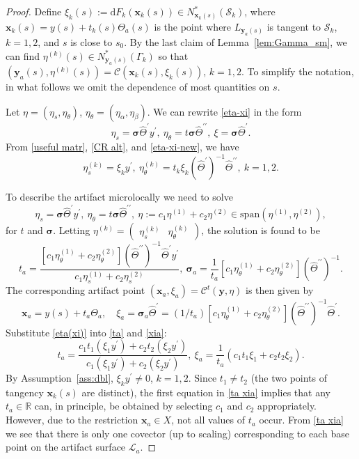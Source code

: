 \documentclass[11pt]{article}
\newcommand{\be}{\begin{equation}}
\newcommand{\ee}{\end{equation}}
\newcommand{\s}{\mathcal S}
\newcommand{\cC}{\mathcal C}
\newcommand{\CL}{\mathcal L}
\newcommand{\br}{\mathbb{R}}
\newcommand{\bt}{\beta}
\newcommand{\al}{\alpha}
\newcommand{\dd}{\mathrm{d}}
\numberwithin{equation}{section}
\newcommand{\vy}{\mathbf{y}}
\newcommand{\vx}{\mathbf{x}}
\newcommand{\vsig}{{\boldsymbol{\sigma}}}
\theoremstyle{definition}
\begin{document}
\begin{proof} 
Define $\xi_k(s):=\dd F_k(\vx_k(s))\in N_{\vx_k(s)}^*(\s_k)$, where $\vx_k(s)=y(s)+t_k(s)\Theta_a(s)$ is the point where $L_{\vy_a(s)}$ is tangent to $\s_k$, $k=1,2$, and $s$ is close to $s_0$. By the last claim of Lemma~\ref{lem:Gamma_sm}, we can find $\eta^{(k)}(s)\in N_{\vy_a(s)}^*(\Gamma_k)$ so that $(\vy_a(s),\eta^{(k)}(s))=\mathcal{C}(\vx_k(s),\xi_k(s))$, $k=1,2$. To simplify the notation, in what follows we omit the dependence of most quantities on $s$. 

Let $\eta=(\eta_s,\eta_\theta)$, $\eta_{\theta}=(\eta_\al,\eta_\bt)$. We can rewrite \eqref{eta-xi} in the form
\be\label{eta-xi-new}
\eta_s=\vsig\hat\Theta^\prime y^\prime,\ \eta_\theta=t\vsig\hat\Theta^{\prime\prime},\ 
\xi=\vsig\hat\Theta^\prime.
\ee
From \eqref{useful matr}, \eqref{CR alt}, and \eqref{eta-xi-new}, we have
\be\label{eta(xi)}
\eta_s^{(k)}=\xi_k y^\prime,\ \eta_\theta^{(k)}=t_k\xi_k(\hat\Theta^\prime)^{-1}\hat\Theta^{\prime\prime},\ k=1,2.
\ee

To describe the artifact microlocally we need to solve
\be\label{etas}
\eta_s=\vsig\hat\Theta^\prime y^\prime,\ \eta_\theta=t\vsig\hat\Theta^{\prime\prime},\ \eta:=c_1\eta^{(1)}+c_2\eta^{(2)}\in\mathrm{span}(\eta^{(1)},\eta^{(2)}),
\ee
for $t$ and $\vsig$. Letting $\eta^{(k)} = \begin{pmatrix}\eta_s^{(k)} & \eta_\theta^{(k)}\end{pmatrix}$, the solution is found to be
\be\label{ta}
t_a=\frac{  [c_1\eta_\theta^{(1)}+c_2\eta_\theta^{(2)}](\hat\Theta^{\prime\prime})^{-1} \hat\Theta^\prime y^\prime}{c_1\eta_s^{(1)}+c_2\eta_s^{(2)}},\ \vsig_a=\frac 1{t_a} [c_1\eta_\theta^{(1)}+c_2\eta_\theta^{(2)}](\hat\Theta^{\prime\prime})^{-1}.
\ee
The corresponding artifact point $(\vx_a,\xi_a)=\cC^t(\vy,\eta)$ is then given by 
\be\label{xia}
\vx_a=y(s)+t_a\Theta_a,\quad \xi_a=\vsig_a\hat\Theta^\prime=(1/t_a)[c_1\eta_\theta^{(1)}+c_2\eta_\theta^{(2)}] (\hat\Theta^{\prime\prime})^{-1}\hat\Theta^\prime.
\ee
Substitute \eqref{eta(xi)} into \eqref{ta} and \eqref{xia}:
\be\label{ta xia}
t_a=\frac{c_1t_1(\xi_1 y^\prime)+c_2t_2(\xi_2 y^\prime)}{c_1(\xi_1 y^\prime)+c_2(\xi_2 y^\prime)},\ \xi_a=\frac 1{t_a} (c_1t_1\xi_1+c_2t_2\xi_2).
\ee
By Assumption~\ref{ass:dbl}, $\xi_k y^\prime\not=0$, $k=1,2$. 
Since $t_1\not=t_2$ (the two points of tangency $\vx_k(s)$ are distinct), the first equation in \eqref{ta xia} implies that any $t_a\in\br$ can, in principle, be obtained by selecting $c_1$ and $c_2$ appropriately. However, due to the restriction $\vx_a\in X$, not all values of $t_a$ occur. From \eqref{ta xia} we see that there is only one covector (up to scaling) corresponding to each base point on the artifact surface $\CL_a$. 


\end{proof}
\end{document}
